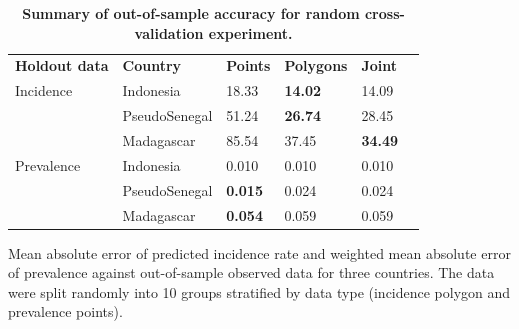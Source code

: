 \documentclass[10pt,letterpaper]{article}
\newlength\savedwidth
\newcommand\thickhline{\noalign{\global\savedwidth\arrayrulewidth\global\arrayrulewidth 2pt}%
\hline
\noalign{\global\arrayrulewidth\savedwidth}}
\begin{document}
\begin{table}[!ht]
\begin{adjustwidth}{-2.25in}{0in} %
\centering
\caption{
{\bf Summary of out-of-sample accuracy for random cross-validation experiment.}}
\begin{tabular}{llllll}
\hline
{\bf Holdout data} & {\bf Country} &  {\bf Points} & {\bf Polygons} & {\bf Joint} \\
\thickhline 
Incidence & Indonesia & 18.33 & {\bf 14.02} &  14.09\\
& PseudoSenegal & 51.24 & {\bf 26.74} &  28.45\\
& Madagascar & 85.54 & 37.45 &  {\bf 34.49}\vspace{3mm}\\
Prevalence & Indonesia & 0.010 & 0.010 &  0.010\\
& PseudoSenegal & {\bf 0.015} & 0.024 &  0.024\\
& Madagascar & {\bf 0.054} & 0.059 &  0.059\\
\end{tabular}
\begin{flushleft}
Mean absolute error of predicted incidence rate and weighted mean absolute error of prevalence against out-of-sample observed data for three countries.
The data were split randomly into 10 groups stratified by data type (incidence polygon and prevalence points).
\end{flushleft}
\label{table1}
\end{adjustwidth}
\end{table}
\end{document}
